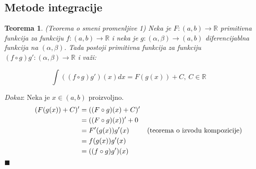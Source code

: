 \documentclass{article}
\newtheorem{teorema}{Teorema}[section]
\begin{document}
\subsection{Metode integracije}
\begin{teoremabox}
    \begin{teorema} \label{teorema_1.2}
        (Teorema o smeni promenljive 1) Neka je $F: (a, b) \longrightarrow \mathbb{R}$ primitivna funkcija za funkciju $f:(a, b) \longrightarrow \mathbb{R}$ i neka je $g: (\alpha, \beta) \longrightarrow (a, b)$ diferencijablna funkcija na $(\alpha, \beta)$. Tada postoji primitivna funkcija za funkciju $(f\circ g) g' : (\alpha, \beta) \longrightarrow \mathbb{R}$ i važi:\par
        \begin{equation*}
            \int ((f\circ g) g')(x)dx = F(g(x)) + C,\ C\in\mathbb{R}
        \end{equation*}
    \end{teorema}
\end{teoremabox}
\textit{Dokaz}: Neka je $x \in (a, b)$ proizvoljno.
\begin{align*}
    \hspace*{1cm}    (F(g(x)) + C)' & = ((F \circ g)(x) + C)'                                         \\
                                    & = ((F \circ g)(x))' + 0                                         \\
                                    & = F'(g(x))  g'(x)       & \text{(teorema o izvodu kompozicije)} \\
                                    & = f(g(x))  g'(x)                                                \\
                                    & = ((f \circ g)  g')(x)
\end{align*}
\null\hfill $\blacksquare$ \par
\end{document}
